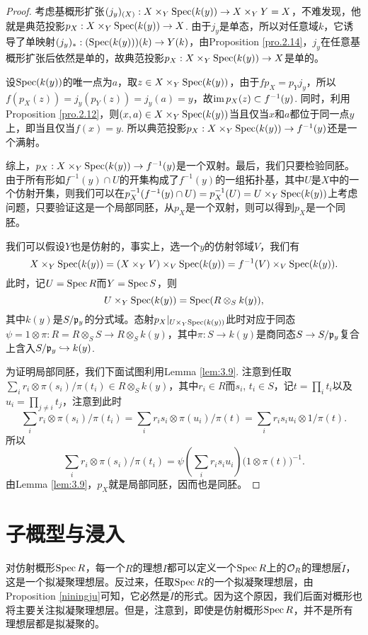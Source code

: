 \begin{proof}
考虑基概形扩张$(j_y)_{(X)}:X\times_Y \operatorname{Spec} (k(y))\to X\times_Y Y=X$，不难发现，他就是典范投影$p_X:X\times_Y \operatorname{Spec} (k(y))\to X$. 由于$j_y$是单态，所以对任意域$k$，它诱导了单映射$(j_y)_*:(\operatorname{Spec} (k(y)))(k)\to Y(k)$，由Proposition \ref{pro.2.14}，$j_y$在任意基概形扩张后依然是单的，故典范投影$p_X:X\times_Y \operatorname{Spec} (k(y))\to X$是单的。

设$\operatorname{Spec}(k(y))$的唯一点为$a$，取$z\in X\times_Y \operatorname{Spec} (k(y))$，由于$fp_X=p_Yj_y$，所以$f(p_X(z))=j_y(p_Y(z))=j_y(a)=y$，故$\operatorname{im} p_X(z)\subset f^{-1}(y)$. 同时，利用Proposition \ref{pro.2.12}，则$(x,a)\in X\times_Y\operatorname{Spec} (k(y))$当且仅当$x$和$a$都位于同一点$y$上，即当且仅当$f(x)=y$. 所以典范投影$p_X:X\times_Y \operatorname{Spec} (k(y))\to f^{-1}(y)$还是一个满射。

综上，$p_X:X\times_Y \operatorname{Spec} (k(y))\to f^{-1}(y)$是一个双射。最后，我们只要检验同胚。由于所有形如$f^{-1}(y)\cap U$的开集构成了$f^{-1}(y)$的一组拓扑基，其中$U$是$X$中的一个仿射开集，则我们可以在$p_X^{-1}(f^{-1}(y)\cap U)=p_X^{-1}(U)=U \times_Y \operatorname{Spec} (k(y))$上考虑问题，只要验证这是一个局部同胚，从$p_X$是一个双射，则可以得到$p_X$是一个同胚。

我们可以假设$Y$也是仿射的，事实上，选一个$y$的仿射邻域$V$，我们有
\[
	X\times_Y \operatorname{Spec} (k(y))=(X\times_Y V)\times_V \operatorname{Spec} (k(y))=f^{-1}(V)\times_V \operatorname{Spec} (k(y)).
\]
此时，记$U=\operatorname{Spec} R$而$Y=\operatorname{Spec} S$，则
\[
	U \times_Y \operatorname{Spec} (k(y))=\operatorname{Spec} (R\otimes_S k(y)),
\]
其中$k(y)$是$S/\mathfrak{p}_y$的分式域。态射$p_X|_{U \times_Y \operatorname{Spec} (k(y))}$此时对应于同态$\psi=1\otimes \pi:R=R\otimes_S S\to R\otimes_S k(y)$，其中$\pi:S\to k(y)$是商同态$S\to S/\mathfrak{p}_y$复合上含入$S/\mathfrak{p}_y\hookrightarrow k(y)$.

为证明局部同胚，我们下面试图利用Lemma \ref{lem:3.9}. 注意到任取$\sum_i r_i \otimes \pi(s_i)/\pi(t_i)\in R\otimes_S k(y)$，其中$r_i\in R$而$s_i$, $t_i\in S$，记$t=\prod_i t_i$以及$u_i=\prod_{j\neq i}t_j$，注意到此时
\[
	\sum_i r_i \otimes \pi(s_i)/\pi(t_i)=\sum_i r_is_i \otimes \pi(u_i)/\pi(t)=\sum_i r_is_iu_i \otimes 1/\pi(t).
\]
所以
\[
	\sum_i r_i \otimes \pi(s_i)/\pi(t_i)=\psi\left(\sum_i r_is_iu_i\right)\bigl(1\otimes \pi(t)\bigr)^{-1}.
\]
由Lemma \ref{lem:3.9}，$p_X$就是局部同胚，因而也是同胚。
\end{proof}

\section{子概型与浸入}

对仿射概形$\operatorname{Spec} R$，每一个$R$的理想$I$都可以定义一个$\operatorname{Spec} R$上的$\mathcal{O}_R$的理想层$\widetilde{I}$，这是一个拟凝聚理想层。反过来，任取$\operatorname{Spec} R$的一个拟凝聚理想层，由Proposition \ref{niningju}可知，它必然是$\widetilde{I}$的形式。因为这个原因，我们后面对概形也将主要关注拟凝聚理想层。但是，注意到，即使是仿射概形$\operatorname{Spec} R$，并不是所有理想层都是拟凝聚的。

